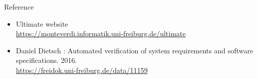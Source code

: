 \documentclass[12pt]{beamer}
\newcommand{\ultimateURL}{\url{https://monteverdi.informatik.uni-freiburg.de/ultimate}}
\begin{document}

\begin{frame}{Reference}
	\begin{itemize}
		\item Ultimate website\\
		\ultimateURL
		\item Daniel Dietsch : Automated verification of system requirements and software specifications. 2016.\\
		\url{https://freidok.uni-freiburg.de/data/11159}
	\end{itemize}
\end{frame}
\end{document}
